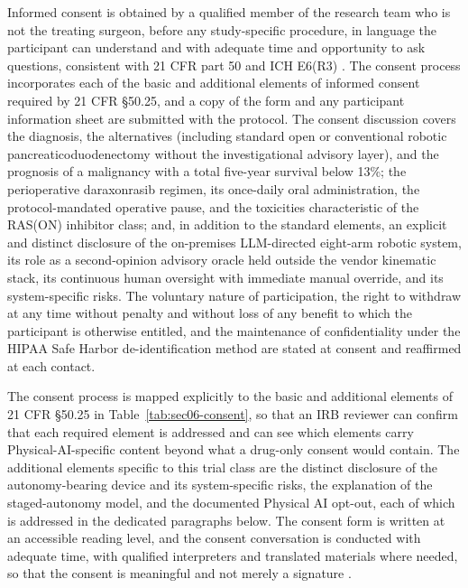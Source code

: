 Informed consent is obtained by a qualified member of the research team who is not
the treating surgeon, before any study-specific procedure, in language the
participant can understand and with adequate time and opportunity to ask questions,
consistent with 21 CFR part 50 and ICH E6(R3) \cite{cfr050paiuni,ichpaistduni}. The
consent process incorporates each of the basic and additional elements of informed
consent required by 21 CFR \S 50.25, and a copy of the form and any participant
information sheet are submitted with the protocol. The consent discussion covers the
diagnosis, the alternatives (including standard open or conventional robotic
pancreaticoduodenectomy without the investigational advisory layer), and the
prognosis of a malignancy with a total five-year survival below 13\%; the
perioperative daraxonrasib regimen, its once-daily oral administration, the
protocol-mandated operative pause, and the toxicities characteristic of the RAS(ON)
inhibitor class; and, in addition to the standard elements, an explicit and distinct
disclosure of the on-premises LLM-directed eight-arm robotic system, its role as a
second-opinion advisory oracle held outside the vendor kinematic stack, its
continuous human oversight with immediate manual override, and its system-specific
risks. The voluntary nature of participation, the right to withdraw at any time
without penalty and without loss of any benefit to which the participant is otherwise
entitled, and the maintenance of confidentiality under the HIPAA Safe Harbor
de-identification method are stated at consent and reaffirmed at each contact.

The consent process is mapped explicitly to the basic and additional elements of 21
CFR \S 50.25 in Table~\ref{tab:sec06-consent}, so that an IRB reviewer can confirm
that each required element is addressed and can see which elements carry
Physical-AI-specific content beyond what a drug-only consent would contain. The
additional elements specific to this trial class are the distinct disclosure of the
autonomy-bearing device and its system-specific risks, the explanation of the
staged-autonomy model, and the documented Physical AI opt-out, each of which is
addressed in the dedicated paragraphs below. The consent form is written at an
accessible reading level, and the consent conversation is conducted with adequate
time, with qualified interpreters and translated materials where needed, so that the
consent is meaningful and not merely a signature \cite{cfr050paiuni,clintrustpai}.

